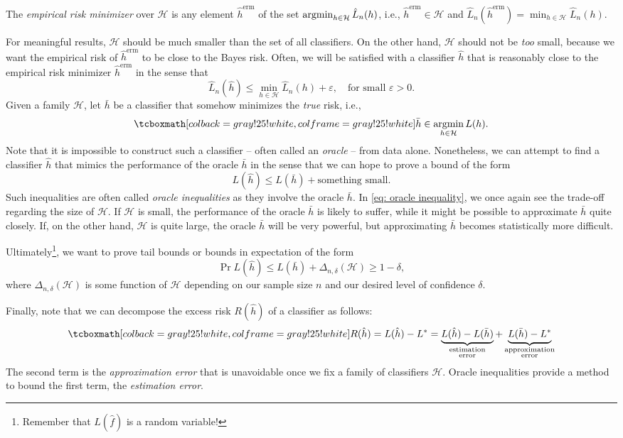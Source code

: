 \begin{definition}
The \emph{empirical risk minimizer} over $\mathcal{H}$ is any element $\hat h^{\text{erm}}$ of the set $\operatorname*{argmin}_{h \in \mathcal{H}} \hat L_n(h)$, i.e., $\hat h^{\text{erm}} \in \mathcal{H}$ and $\hat L_n(\hat h^{\text{erm}}) = \min_{h \in \mathcal{H}} \hat L_n(h)$.
\end{definition}

For meaningful results, $\mathcal{H}$ should be much smaller than the set of all classifiers. On the other hand, $\mathcal{H}$ should not be \emph{too} small, because we want the empirical risk of $\hat h^{\text{erm}}$ to be close to the Bayes risk. Often, we will be satisfied with a classifier $\hat h$ that is reasonably close to the empirical risk minimizer $\hat h^{\text{erm}}$ in the sense that
\[
    \hat L_n(\hat h) \leq \min_{h \in \mathcal{H}} \hat L_n(h) + \varepsilon, \quad \text{for small } \varepsilon > 0.
\]
Given a family $\mathcal{H}$, let $\bar h$ be a classifier that somehow minimizes the \emph{true} risk, i.e.,
\[
    \highlightMath{
        \bar h \in \argmin_{h\in \mathcal{H}} L(h).
    }
\]
Note that it is impossible to construct such a classifier -- often called an \emph{oracle} -- from data alone. Nonetheless, we can attempt to find a classifier $\hat h$ that mimics the performance of the oracle $\bar h$ in the sense that we can hope to prove a bound of the form
\begin{equation}
    \label{eq: oracle inequality}
    L(\hat h) \leq L(\bar h) + \text{something small}.
\end{equation}
Such inequalities are often called \emph{oracle inequalities} as they involve the oracle $\bar h$. In \eqref{eq: oracle inequality}, we once again see the trade-off regarding the size of $\mathcal{H}$. If $\mathcal{H}$ is small, the performance of the oracle $\bar h$ is likely to suffer, while it might be possible to approximate $\bar h$ quite closely. If, on the other hand, $\mathcal{H}$ is quite large, the oracle $\bar h$ will be very powerful, but approximating $\bar h$ becomes statistically more difficult.

Ultimately\footnote{Remember that $L(\hat f)$ is a random variable!}, we want to prove tail bounds or bounds in expectation of the form
\[
    \Pr{L(\hat h) \leq L(\bar h) + \Delta_{n, \delta}(\mathcal{H})} \geq 1 - \delta,
\]
where $\Delta_{n, \delta}(\mathcal{H})$ is some function of $\mathcal{H}$ depending on our sample size $n$ and our desired level of confidence $\delta$.

Finally, note that we can decompose the excess risk $R(\hat h)$ of a classifier as follows:
\[
    \highlightMath{
        R(\hat h) = L(\hat h) - L^* = \underbrace{L(\hat h) - L(\bar h)}_{\substack{\text{estimation} \\ \text{error}}} + \underbrace{L(\bar h) - L^*}_{\substack{\text{approximation} \\ \text{error}}}
    }
\]
The second term is the \emph{approximation error} that is unavoidable once we fix a family of classifiers $\mathcal{H}$. Oracle inequalities provide a method to bound the first term, the \emph{estimation error}.
